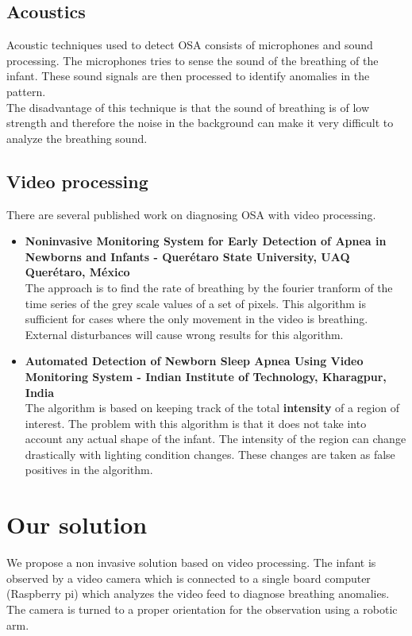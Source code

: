 \documentclass{report}
\begin{document}
\subsection{Acoustics}
Acoustic techniques used to detect OSA consists of microphones and sound processing. The microphones tries to sense the sound of the breathing of the infant. These sound signals are then processed to identify anomalies in the pattern.\\
The disadvantage of this technique is that the sound of breathing is of low strength and therefore the noise in the background can make it very difficult to analyze the breathing sound.\\


\subsection{Video processing}
There are several published work on diagnosing OSA with video processing. 
\begin{itemize}
    \item \textbf{Noninvasive Monitoring System for Early Detection of Apnea in Newborns and Infants - Querétaro State University, UAQ Querétaro, México}\\
    The approach is to find the rate of breathing by the fourier tranform of the time series of the grey scale values of a set of pixels. This algorithm is sufficient for cases where the only movement in the video is breathing. External disturbances will cause wrong results for this algorithm.
    
    \item \textbf{Automated Detection of Newborn Sleep Apnea Using Video Monitoring System - Indian Institute of Technology, Kharagpur, India}\\
    The algorithm is based on keeping track of the total \textbf{intensity} of a region of interest. The problem with this algorithm is that it does not take into account any actual shape of the infant. The intensity of the region can change drastically with lighting condition changes. These changes are taken as false positives in the algorithm.
    
\end{itemize}

\section{Our solution}

We propose a non invasive solution based on video processing. The infant is observed by a video camera which is connected to a single board computer (Raspberry pi) which analyzes the video feed to diagnose breathing anomalies. The camera is turned to a proper orientation for the observation using a robotic arm.\\
\end{document}
